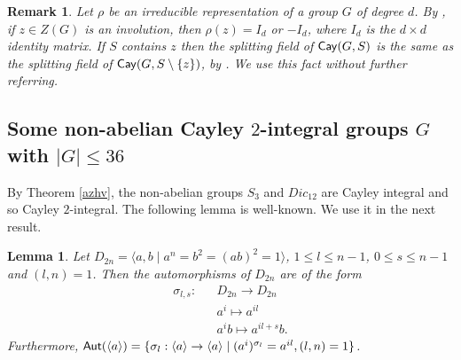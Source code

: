 \documentclass{amsart}
\newtheorem{rem}[thm]{Remark}
\newtheorem{lem}[thm]{Lemma}
\def \leq {\leqslant}
\def\Aut{{\sf Aut}} \def\Inn{{\sf Inn}}\def\Core{{\sf Core}}
\def\Cay{{\sf Cay}} \def\Ker{{\sf Ker}}
\begin{document}
\begin{rem}
	Let $\rho$ be an irreducible representation of a group $G$ of degree $d$. By \cite[Proposition 9.14]{JL}, if $z\in Z(G)$ is an involution, then $\rho(z)=I_d$ or $-I_d$, where $I_d$ is the $d\times d$ identity matrix.  If $S$ contains $z$ then the splitting field of   $\Cay(G, S)$ is the same as the splitting field  of $\Cay(G, S\setminus\{z\})$, by \cite[Corollary 7]{AT}. 
	We use this fact  without further  referring.
\end{rem}


\subsection{Some non-abelian Cayley $2$-integral groups $G$ with $|G|\leq 36$}


By Theorem \ref{azhv}, the non-abelian groups $S_3$ and $Dic_{12}$ are Cayley integral and so Cayley $2$-integral. The following lemma is well-known. We use it in the next result.
\begin{lem}\label{aut}
	Let $D_{2n}=\langle a,b\mid
	a^n=b^2=(ab)^2=1\rangle$, $1\leq l\leq n-1$,
	$0\leq s\leq n-1$ and $(l,n)=1$. Then the automorphisms of $D_{2n}$
	are of the form
	\begin{eqnarray*}
		\sigma_{l,s}:&&D_{2n}\rightarrow D_{2n}\\
		&&a^i\mapsto a^{il}\\
		&&a^ib\mapsto a^{il+s}b.
	\end{eqnarray*}
	Furthermore,
	$\Aut(\langle a\rangle)=\{\sigma_l:\langle a\rangle\rightarrow\langle a\rangle \mid (a^{i})^{\sigma_l}=a^{il}, (l,n)=1\}$.
\end{lem}
\end{document}
